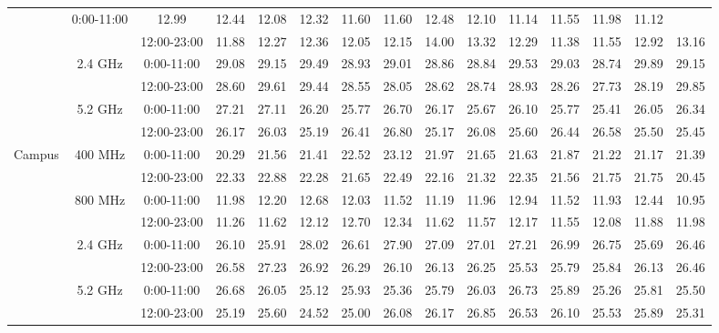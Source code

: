 \begin{table}
\begin{tabular}{|l|c|c|c|c|c|c|c|c|c|c|c|c|c|c|}
&0:00-11:00 &  12.99 &  12.44 &  12.08 &  12.32 &  11.60 &  11.60&  12.48 &  12.10&  11.14 &  11.55&  11.98 &  11.12 \\ 	
\cline{3-15}	
&&12:00-23:00&  11.88 &  12.27 &  12.36 &  12.05 &  12.15 &  14.00&  13.32 &  12.29&  11.38 &  11.55&  12.92 &  13.16 \\ 	
\cline{2-15}	
&\multirow{2}{*}{2.4 GHz}	
&0:00-11:00 &  29.08 &  29.15 &  29.49 &  28.93 &  29.01 &  28.86&  28.84 &  29.53&  29.03 &  28.74&  29.89 &  29.15 \\ 	
\cline{3-15}	
&&12:00-23:00&  28.60 &  29.61 &  29.44 &  28.55 &  28.05 &  28.62&  28.74 &  28.93&  28.26 &  27.73&  28.19 &  29.85 \\ 	
\cline{2-15}	
&\multirow{2}{*}{5.2 GHz}	
&0:00-11:00 &  27.21 &  27.11 &  26.20 &  25.77 &  26.70 &  26.17&  25.67 &  26.10&  25.77 &  25.41&  26.05 &  26.34 \\ 	
\cline{3-15}	
&&12:00-23:00&  26.17 &  26.03 &  25.19 &  26.41 &  26.80 &  25.17&  26.08 &  25.60&  26.44 &  26.58&  25.50 &  25.45 \\ 	
\hline	
\multirow{8}{*}{Campus}	
&\multirow{2}{*}{400 MHz}	
&0:00-11:00 &  20.29 &  21.56 &  21.41 &  22.52 &  23.12 &  21.97&  21.65 &  21.63&  21.87 &  21.22&  21.17 &  21.39 \\ 	
\cline{3-15}	
&&12:00-23:00&  22.33 &  22.88 &  22.28 &  21.65 &  22.49 &  22.16&  21.32 &  22.35&  21.56 &  21.75&  21.75 &  20.45 \\ 	
\cline{2-15}	
&\multirow{2}{*}{800 MHz}	
&0:00-11:00 &  11.98 &  12.20 &  12.68 &  12.03 &  11.52 &  11.19&  11.96 &  12.94&  11.52 &  11.93&  12.44 &  10.95 \\ 	
\cline{3-15}	
&&12:00-23:00&  11.26 &  11.62 &  12.12 &  12.70 &  12.34 &  11.62&  11.57 &  12.17&  11.55 &  12.08&  11.88 &  11.98 \\ 	
\cline{2-15}	
&\multirow{2}{*}{2.4 GHz}	
&0:00-11:00 &  26.10 &  25.91 &  28.02 &  26.61 &  27.90 &  27.09&  27.01 &  27.21&  26.99 &  26.75&  25.69 &  26.46 \\ 	
\cline{3-15}	
&&12:00-23:00&  26.58 &  27.23 &  26.92 &  26.29 &  26.10 &  26.13&  26.25 &  25.53&  25.79 &  25.84&  26.13 &  26.46 \\ 	
\cline{2-15}	
&\multirow{2}{*}{5.2 GHz}	
&0:00-11:00 &  26.68 &  26.05 &  25.12 &  25.93 &  25.36 &  25.79&  26.03 &  26.73&  25.89 &  25.26&  25.81 &  25.50 \\ 	
\cline{3-15}	
&&12:00-23:00&  25.19 &  25.60 &  24.52 &  25.00 &  26.08 &  26.17&  26.85 &  26.53&  26.10 &  25.53&  25.89 &  25.31 \\ 	

\end{tabular}
\end{table}
